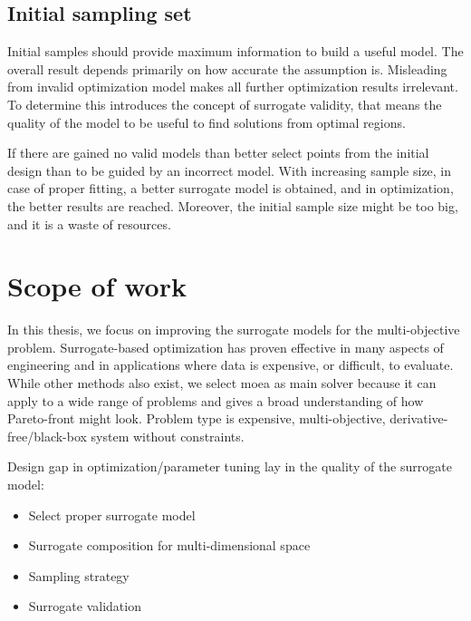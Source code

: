        \subsection{Initial sampling set}
        Initial samples should provide maximum information to build a useful model. The overall result depends primarily on how accurate the assumption is. Misleading from invalid optimization model makes all further optimization results irrelevant. To determine this introduces the concept of surrogate validity, that means the quality of the model to be useful to find solutions from optimal regions. 

        If there are gained no valid models than better select points from the initial design than to be guided by an incorrect model. With increasing sample size, in case of proper fitting, a better surrogate model is obtained, and in optimization, the better results are reached. Moreover, the initial sample size might be too big, and it is a waste of resources. 


    \section{Scope of work}
        In this thesis, we focus on improving the surrogate models for the multi-objective problem. Surrogate-based optimization has proven effective in many aspects of engineering and in applications where data is expensive, or difficult, to evaluate. While other methods also exist, we select \gls{moea} as main solver because it can apply to a wide range of problems and gives a broad understanding of how Pareto-front might look. Problem type is expensive, multi-objective, derivative-free/black-box system without constraints.

        Design gap in optimization/parameter tuning lay in the quality of the surrogate model:
            \begin{itemize}
                \item Select proper surrogate model
                \item Surrogate composition for multi-dimensional space
                \item Sampling strategy
                \item Surrogate validation
            \end{itemize}


